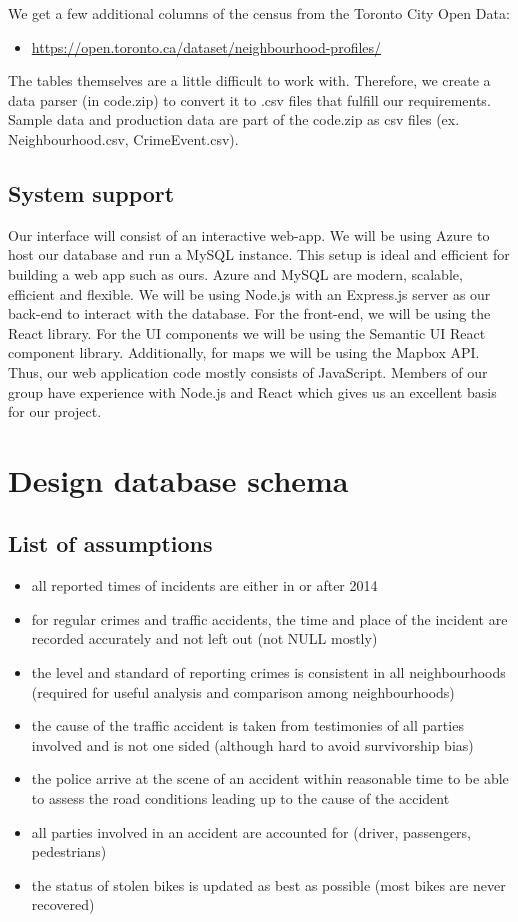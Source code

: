 \documentclass[12pt, a4paper]{article}
\begin{document}
We get a few additional columns of the census from the Toronto City Open Data:
\begin{itemize}

 \item \url{https://open.toronto.ca/dataset/neighbourhood-profiles/}
\end{itemize}
\color{black}
The tables themselves are a little difficult to work with. Therefore, we create a data parser (in code.zip) to convert it to .csv files that fulfill our requirements. Sample data and production data are part of the code.zip as csv files (ex. Neighbourhood.csv, CrimeEvent.csv).
\subsection*{System support}
Our interface will consist of an interactive web-app. We will be using Azure to host our database and run a MySQL instance. This setup is ideal and efficient for building a web app such as ours. Azure and MySQL are modern, scalable, efficient and flexible. We will be using Node.js with an Express.js server as our back-end to interact with the database. For the front-end, we will be using the React library. For the UI components we will be using the Semantic UI React component library. Additionally, for maps we will be using the Mapbox API. \color{black}Thus, our web application code mostly consists of JavaScript. Members of our group have experience with Node.js and React which gives us an excellent basis for our project. 

\section*{Design database schema}
\subsection*{List of assumptions}
\begin{itemize}
    \item all reported times of incidents are either in or after 2014
    \item for regular crimes and traffic accidents, the time and place of the incident are recorded accurately and not left out (not NULL mostly)
    \item the level and standard of reporting crimes is consistent in all neighbourhoods (required for useful analysis and comparison among neighbourhoods)
    \item the cause of the traffic accident is taken from testimonies of all parties involved and is not one sided (although hard to avoid survivorship bias)
    \item the police arrive at the scene of an accident within reasonable time to be able to assess the road conditions leading up to the cause of the accident
    \item all parties involved in an accident are accounted for (driver, passengers, pedestrians)
    \item the status of stolen bikes is updated as best as possible (most bikes are never recovered)
\end{itemize}
\end{document}
